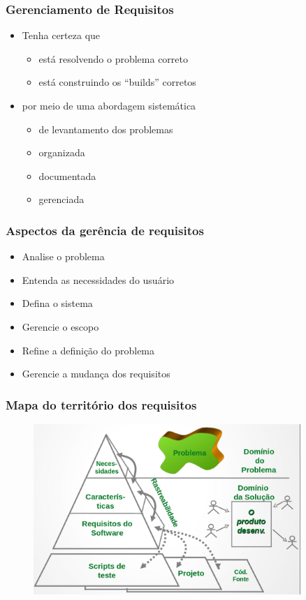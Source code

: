 \begin{frame}
 \frametitle{Gerenciamento de Requisitos}
 \begin{itemize}
  \item Tenha certeza que
  \begin{itemize}
   \item está resolvendo o problema correto
   \item está construindo os “builds” corretos
  \end{itemize}
  \item por meio de uma abordagem sistemática
  \begin{itemize}
   \item de levantamento dos problemas
   \item organizada
   \item documentada
   \item gerenciada 
   \end{itemize}

 \end{itemize}

\end{frame}

\begin{frame}
 \frametitle{Aspectos da gerência de requisitos}
 \begin{itemize}
  \item Analise o problema
  \item Entenda as necessidades do usuário
  \item Defina o sistema
  \item Gerencie o escopo
  \item Refine a definição do problema
  \item Gerencie a mudança dos requisitos
 \end{itemize}
\end{frame}

\begin{frame}
 \frametitle{Mapa do território dos requisitos}
  \begin{figure}
   \centering
   \includegraphics[width = 0.9\textwidth]{figs/fig10.png}
  \end{figure}
\end{frame}



